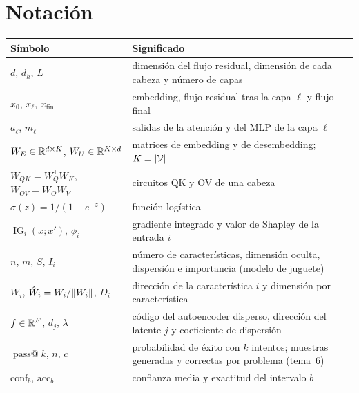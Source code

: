 \documentclass[11pt,a4paper,twoside,openany]{book}
\makeatletter
\newcommand{\T}{^{\top}}
\newcommand{\WU}{W_{U}}
\newcommand{\WE}{W_{E}}
\newcommand{\WOV}{W_{OV}}
\newcommand{\WQK}{W_{QK}}
\newcommand{\IG}{\operatorname{IG}}
\newcommand{\passk}[1]{\operatorname{pass@}#1}
\makeatother
\begin{document}
\section*{Notación}
\begin{center}\small
\begin{tabularx}{\textwidth}{@{}l>{\raggedright\arraybackslash}X@{}}
\toprule
Símbolo & Significado \\
\midrule
$d$, $d_h$, $L$ & dimensión del flujo residual, dimensión de cada cabeza y número de capas \\
$x_0$, $x_\ell$, $x_{\mathrm{fin}}$ & embedding, flujo residual tras la capa $\ell$ y flujo final \\
$a_\ell$, $m_\ell$ & salidas de la atención y del MLP de la capa $\ell$ \\
$\WE\in\R^{d\times K}$, $\WU\in\R^{K\times d}$ & matrices de embedding y de desembedding; $K=\lvert\mathcal{V}\rvert$ \\
$\WQK=W_Q\T W_K$, $\WOV=W_OW_V$ & circuitos QK y OV de una cabeza \\
$\sigma(z)=1/(1+e^{-z})$ & función logística \\
$\IG_i(x;x')$, $\phi_i$ & gradiente integrado y valor de Shapley de la entrada $i$ \\
$n$, $m$, $S$, $I_i$ & número de características, dimensión oculta, dispersión e importancia (modelo de juguete) \\
$W_i$, $\hat W_i=W_i/\lVert W_i\rVert$, $D_i$ & dirección de la característica $i$ y dimensión por característica \\
$f\in\mathbb{R}^{F}$, $d_j$, $\lambda$ & código del autoencoder disperso, dirección del latente $j$ y coeficiente de dispersión \\
$\passk{k}$, $n$, $c$ & probabilidad de éxito con $k$ intentos; muestras generadas y correctas por problema (tema~6) \\
$\mathrm{conf}_b$, $\mathrm{acc}_b$ & confianza media y exactitud del intervalo $b$ \\
\bottomrule
\end{tabularx}
\end{center}

\tableofcontents

\mainmatter







\appendix


\backmatter

\end{document}
